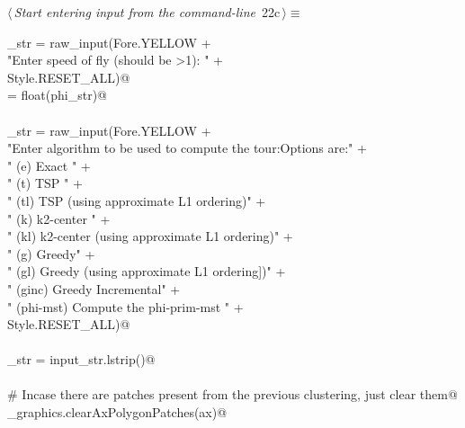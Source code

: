 \documentclass[11.5pt]{report}
\begin{document}
\vspace{-0.8cm}\newchunk 
\begin{flushleft} \small\label{scrap17}\raggedright\small
{} $\langle\,${\itshape Start entering input from the command-line}\nobreak\ {\footnotesize {22c}}$\,\rangle\equiv$
\vspace{-1ex}
\begin{list}{}{} \item
\mbox{}\verb@phi_str = raw_input(Fore.YELLOW + \@\\
\mbox{}\verb@          "Enter speed of fly (should be >1): " +\@\\
\mbox{}\verb@           Style.RESET_ALL)@\\
\mbox{}\verb@phi = float(phi_str)@\\
\mbox{}\verb@@\\
\mbox{}\verb@input_str = raw_input(Fore.YELLOW + \@\\
\mbox{}\verb@          "Enter algorithm to be used to compute the tour:\n Options are:\n" +\@\\
\mbox{}\verb@        "  (e)   Exact \n"                                   +\@\\
\mbox{}\verb@        "  (t)   TSP   \n"                                   +\@\\
\mbox{}\verb@        "  (tl)  TSP   (using approximate L1 ordering)\n"    +\@\\
\mbox{}\verb@        "  (k)   k2-center   \n"                             +\@\\
\mbox{}\verb@        "  (kl)  k2-center (using approximate L1 ordering)\n"  +\@\\
\mbox{}\verb@        "  (g)   Greedy\n"                                   +\@\\
\mbox{}\verb@        "  (gl)  Greedy (using approximate L1 ordering])\n"  +\@\\
\mbox{}\verb@        "  (ginc) Greedy Incremental\n"  +\@\\
\mbox{}\verb@        "  (phi-mst) Compute the phi-prim-mst "               +\@\\
\mbox{}\verb@        Style.RESET_ALL)@\\
\mbox{}\verb@@\\
\mbox{}\verb@input_str = input_str.lstrip()@\\
\mbox{}\verb@@\\
\mbox{}\verb@# Incase there are patches present from the previous clustering, just clear them@\\
\mbox{}\verb@utils_graphics.clearAxPolygonPatches(ax)@\\

\end{list}
\end{flushleft}
\end{document}
